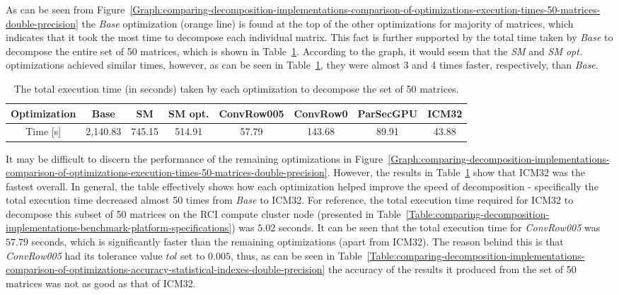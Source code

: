 As can be seen from Figure~\ref{Graph:comparing-decomposition-implementations-comparison-of-optimizations-execution-times-50-matrices-double-precision} the \textit{Base} optimization (orange line) is found at the top of the other optimizations for majority of matrices, which indicates that it took the most time to decompose each individual matrix. This fact is further supported by the total time taken by \textit{Base} to decompose the entire set of 50 matrices, which is shown in Table~\ref{Table:comparing-decomposition-implementations-comparison-of-optimizations-total-execution-time}. According to the graph, it would seem that the \textit{SM} and \textit{SM opt.} optimizations achieved similar times, however, as can be seen in Table~\ref{Table:comparing-decomposition-implementations-comparison-of-optimizations-total-execution-time}, they were almost 3 and 4 times faster, respectively, than \textit{Base}.

\begin{table}[ht!]
	\centering
	\renewcommand{\arraystretch}{1.5}
	\begin{tabular}{ |c|c|c|c|c|c|c|c| } 
		\hline
		Optimization & Base    & SM     & SM opt. & ConvRow005 & ConvRow0 & ParSecGPU & ICM32 \\
		\hline
		Time [s]     & 2,140.83 & 745.15 & 514.91  & 57.79      & 143.68   &  89.91    & 43.88 \\
		\hline
	\end{tabular}
	\caption{The total execution time (in seconds) taken by each optimization to decompose the set of 50 matrices.}
	\label{Table:comparing-decomposition-implementations-comparison-of-optimizations-total-execution-time}
\end{table}

It may be difficult to discern the performance of the remaining optimizations in Figure~\ref{Graph:comparing-decomposition-implementations-comparison-of-optimizations-execution-times-50-matrices-double-precision}. However, the results in Table~\ref{Table:comparing-decomposition-implementations-comparison-of-optimizations-total-execution-time} show that ICM32 was the fastest overall. In general, the table effectively shows how each optimization helped improve the speed of decomposition - specifically the total execution time decreased almost 50 times from \textit{Base} to ICM32. For reference, the total execution time required for ICM32 to decompose this subset of 50 matrices on the RCI compute cluster node (presented in Table~\ref{Table:comparing-decomposition-implementations-benchmark-platform-specifications}) was $ 5.02 $ seconds.
It can be seen that the total execution time for \textit{ConvRow005} was $ 57.79 $ seconds, which is significantly faster than the remaining optimizations (apart from ICM32). The reason behind this is that \textit{ConvRow005} had its tolerance value $ tol $ set to $ 0.005 $, thus, as can be seen in Table~\ref{Table:comparing-decomposition-implementations-comparison-of-optimizations-accuracy-statistical-indexes-double-precision} the accuracy of the results it produced from the set of 50 matrices was not as good as that of ICM32.

